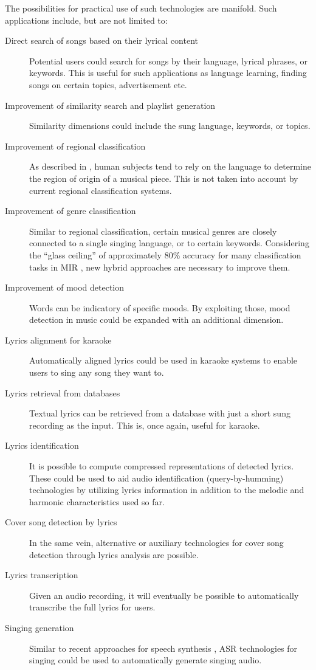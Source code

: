 The possibilities for practical use of such technologies are manifold. Such applications include, but are not limited to:
\begin{description}
\item[Direct search of songs based on their lyrical content] Potential users could search for songs by their language, lyrical phrases, or keywords. This is useful for such applications as language learning, finding songs on certain topics, advertisement etc.
\item[Improvement of similarity search and playlist generation] Similarity dimensions could include the sung language, keywords, or topics.
 \item[Improvement of regional classification] As described in \cite{kruspe11}, human subjects tend to rely on the language to determine the region of origin of a musical piece. This is not taken into account by current regional classification systems.
 \item[Improvement of genre classification] Similar to regional classification, certain musical genres are closely connected to a single singing language, or to certain keywords. Considering the ``glass ceiling'' of approximately 80\% accuracy for many classification tasks in MIR \cite{glass_ceiling}, new hybrid approaches are necessary to improve them.
 \item[Improvement of mood detection] Words can be indicatory of specific moods. By exploiting those, mood detection in music could be expanded with an additional dimension.
 \item[Lyrics alignment for karaoke] Automatically aligned lyrics could be used in karaoke systems to enable users to sing any song they want to.
\item[Lyrics retrieval from databases] Textual lyrics can be retrieved from a database with just a short sung recording as the input. This is, once again, useful for karaoke. 
\item[Lyrics identification] It is possible to compute compressed representations of detected lyrics. These could be used to aid audio identification (query-by-humming) technologies by utilizing lyrics information in addition to the melodic and harmonic characteristics used so far. 
\item[Cover song detection by lyrics] In the same vein, alternative or auxiliary technologies for cover song detection through lyrics analysis are possible.
\item[Lyrics transcription] Given an audio recording, it will eventually be possible to automatically transcribe the full lyrics for users.
\item[Singing generation] Similar to recent approaches for speech synthesis \cite{wavenet}, ASR technologies for singing could be used to automatically generate singing audio.
\end{description}


